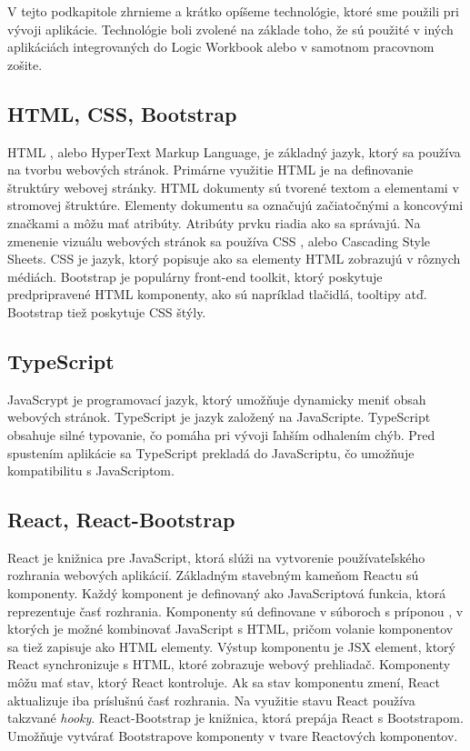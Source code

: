 V tejto podkapitole zhrnieme a krátko opíšeme technológie, ktoré sme použili pri vývoji aplikácie. Technológie boli zvolené na základe toho, že sú použité v iných aplikáciách integrovaných do Logic Workbook alebo v samotnom pracovnom zošite.

\subsection{HTML, CSS, Bootstrap}

HTML \cite{HTMLdocs}, alebo HyperText Markup Language, je základný jazyk, ktorý sa používa na tvorbu webových stránok. Primárne využitie HTML je na definovanie štruktúry webovej stránky. HTML dokumenty sú tvorené textom a elementami v stromovej štruktúre. Elementy dokumentu sa označujú začiatočnými a koncovými značkami a môžu mať atribúty. Atribúty prvku riadia ako sa správajú.
Na zmenenie vizuálu webových stránok sa používa CSS \cite{CSSdocs}, alebo Cascading Style Sheets. CSS je jazyk, ktorý popisuje ako sa elementy HTML zobrazujú v rôznych médiách.
Bootstrap \cite{Bootstrapdocs} je populárny front-end toolkit, ktorý poskytuje predpripravené HTML komponenty, ako sú napríklad tlačidlá, tooltipy atď. Bootstrap tiež poskytuje CSS štýly.

\subsection{TypeScript}

JavaScrypt je programovací jazyk, ktorý umožňuje dynamicky meniť obsah webových stránok. TypeScript \cite{Typescriptdocs} je jazyk založený na JavaScripte. TypeScript obsahuje silné typovanie, čo pomáha pri vývoji ľahším odhalením chýb. Pred spustením aplikácie sa TypeScript prekladá do JavaScriptu, čo umožňuje kompatibilitu s JavaScriptom.

\subsection{React, React-Bootstrap}

React \cite{Reactdocs} je knižnica pre JavaScript, ktorá slúži na vytvorenie používateľského rozhrania webových aplikácií. Základným stavebným kameňom Reactu sú komponenty. Každý komponent je definovaný ako JavaScriptová funkcia, ktorá reprezentuje časť rozhrania. Komponenty sú definovane v súboroch s príponou , v ktorých je možné kombinovať JavaScript s HTML, pričom volanie komponentov sa tiež zapisuje ako HTML elementy. Výstup komponentu je JSX element, ktorý React synchronizuje s HTML, ktoré zobrazuje webový prehliadač. Komponenty môžu mať stav, ktorý React kontroluje. Ak sa stav komponentu zmení, React aktualizuje iba príslušnú časť rozhrania. Na využitie stavu React používa takzvané \emph{hooky}.
React-Bootstrap \cite{ReactBootstrapdocs} je knižnica, ktorá prepája React s Bootstrapom. Umožňuje vytvárať Bootstrapove komponenty v tvare Reactových komponentov.

